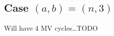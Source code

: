 \subsection{Case $(a,b) = (n,3)$} 
Will have 4 MV cycles\dots TODO

\begin{comment}
\subsection{Old, possibly incorrect or mal-calibrated}

\anne{Here are old calculations, in the conventions of CITE PZJ. Explore cxn (of possible deformed algebra structure) to fusion, from the MV cycle POV.}

\begin{example}[$G = \SL_3$ or $\PGL_3$]
    Let $\lambda = \omega_1 + \omega_2 = (2,1,0)$, $\mu = \omega_3 = (1,1,1)$ and consider the tableaux 
    $$\tau_1 = \young(12,3)\qquad \tau_2 = \young(13,2)$$
    These correspond to the two irreducible components of
    $$\overline{\Gr^{(2,1)}}\cap S^{(1,1)}_-\cong \overline{\OO_{(2,1)}}\cap\n
        = \left\{\begin{bmatrix}
        0 & a & b \\
            & 0 & c \\
            &   & 0 
    \end{bmatrix} : ac = 0 \right\} $$
    as follows
    $$
    X_{\tau_1} = \left\{\begin{bmatrix}
        0 & a & b \\
            & 0 & 0 \\
            &   & 0 
    \end{bmatrix}\right\} \qquad
    X_{\tau_2} = \left\{\begin{bmatrix}
        0 & 0 & b \\
            & 0 & c \\
            &   & 0 
    \end{bmatrix}\right\}
    $$
    The $T\times\CC^\times$-multidegree of $X_{\tau_2}$ is $\hbar + \alpha_1$ (if we normalize like PZJ---else, it'll be $2\hbar + \alpha_1$). The $T\times\CC^\times$-equivariant multiplicity of $X_{\tau_2}$ is 
    $$\frac 1{(\hbar + \alpha_1 + \alpha_2)(\hbar + \alpha_2)}$$
    \end{example}
    \begin{example}[$G = \SL_2$ or $\PGL_2$]
        For an even simpler example take $\lambda = 2\omega_1 = (2,0)$ and $\mu = \omega_2 = (1,1)$. Then 
        $$\overline{\Gr^{(2,0)}}\cap S^{(1,1)}_-\cong \overline{\OO_{(2,0)}\cap\n}$$
        is irreducible, corresponds to the tableau 
        $$\tau = \young(12)$$
        has multidegree 1 and equivariant multiplicity $\frac 1 {\hbar + \alpha}$.  
\end{example}


\end{comment}

